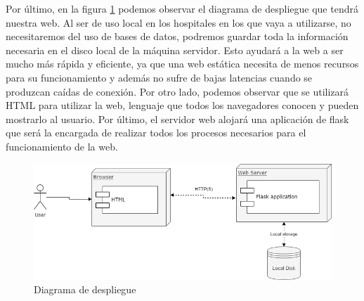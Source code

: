 Por último, en la figura \ref{fig:deploy} podemos observar el diagrama de despliegue que tendrá nuestra web. Al ser de uso local en los hospitales en los que vaya a utilizarse, no necesitaremos del uso de bases de datos, podremos guardar toda la información necesaria en el disco local de la máquina servidor. Esto ayudará a la web a ser mucho más rápida y eficiente, ya que una web estática necesita de menos recursos para su funcionamiento y además no sufre de bajas latencias cuando se produzcan caídas de conexión. Por otro lado, podemos observar que se utilizará HTML para utilizar la web, lenguaje que todos los navegadores conocen y pueden mostrarlo al usuario. Por último, el servidor web alojará una aplicación de flask que será la encargada de realizar todos los procesos necesarios para el funcionamiento de la web.

\begin{figure}[H]
	\centering
	\includegraphics[width=1\textwidth]{images/diagramaDespliegueWeb.png}
	\caption{Diagrama de despliegue}
	\label{fig:deploy}
\end{figure}


\newpage
